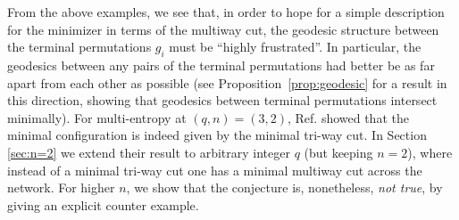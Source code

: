 \documentclass[11pt,oneside,letterpaper]{article}
\numberwithin{equation}{section}
\theoremstyle{definition}
\theoremstyle{remark}
\begin{document}
From the above examples, we see that, in order to hope for a simple description for the minimizer in terms of the multiway cut, the geodesic structure between the terminal permutations $g_i$ must be ``highly frustrated''. In particular, the geodesics between any pairs of the terminal permutations had better be as far apart from each other as possible (see Proposition~\ref{prop:geodesic} for a result in this direction, showing that geodesics between terminal permutations intersect minimally).  For multi-entropy at $(q,n)=(3,2)$, Ref. \cite{Penington:2022dhr} showed that the minimal configuration is indeed given by the minimal tri-way cut. In Section \ref{sec:n=2} we extend their result to arbitrary integer $q$ (but keeping $n=2$), where instead of a minimal tri-way cut one has a minimal multiway cut across the network. For higher $n$, we show that the conjecture is, nonetheless, \emph{not true}, by giving an explicit counter example.
\end{document}
